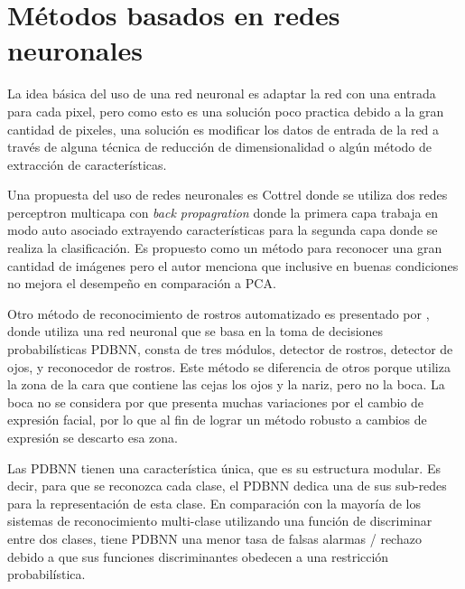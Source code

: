 

\section{Métodos basados en redes neuronales}

La idea básica del uso de una red neuronal es adaptar la red con una entrada para cada pixel, pero como esto es una solución poco practica debido a la gran cantidad de pixeles, una solución es modificar los datos de entrada de la red a través de alguna técnica de reducción de dimensionalidad o algún método de extracción de características.

Una propuesta del uso de redes neuronales es Cottrel\cite{cottrell1990face}  donde se utiliza dos redes perceptron multicapa con \textit{back propagration} donde la primera capa trabaja en modo auto asociado extrayendo características para la segunda capa donde se realiza la clasificación. Es propuesto como un método para reconocer una gran cantidad de imágenes pero el autor menciona que inclusive en buenas condiciones no mejora el desempeño en comparación a \ac{PCA}.

Otro método de reconocimiento de rostros automatizado es presentado por \cite{lin1997face}, donde utiliza una red neuronal que se basa en la toma de decisiones probabilísticas \ac{PDBNN}, consta de tres módulos, detector de rostros, detector de ojos, y reconocedor de rostros. Este método se diferencia de otros porque utiliza la zona de la cara que contiene las cejas los ojos y la nariz, pero no la boca. La boca no se considera por que presenta muchas variaciones por el cambio de expresión facial, por lo que al fin de lograr un método robusto a cambios de expresión se descarto esa zona.

Las \ac{PDBNN} tienen una característica única, que es su estructura modular. Es decir, para que se reconozca cada clase, el PDBNN dedica una de sus sub-redes para la representación de esta clase. En comparación con la mayoría de los sistemas de reconocimiento multi-clase utilizando una función de discriminar entre dos clases, tiene \ac{PDBNN} una menor tasa de falsas alarmas / rechazo debido a que sus funciones discriminantes obedecen a una restricción probabilística.

